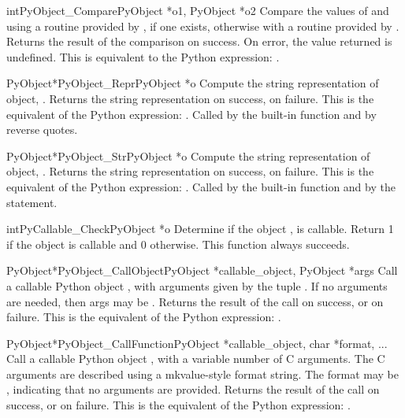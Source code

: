 \documentclass[twoside]{report}
\begin{document}
\begin{cfuncdesc}{int}{PyObject_Compare}{PyObject *o1, PyObject *o2}
Compare the values of  and  using a routine provided by
, if one exists, otherwise with a routine provided by .
Returns the result of the comparison on success.  On error,
the value returned is undefined. This is equivalent to the
Python expression: .
\end{cfuncdesc}


\begin{cfuncdesc}{PyObject*}{PyObject_Repr}{PyObject *o}
Compute the string representation of object, .  Returns the
string representation on success, \NULL{} on failure.  This is
the equivalent of the Python expression: .
Called by the  built-in function and by reverse quotes.
\end{cfuncdesc}


\begin{cfuncdesc}{PyObject*}{PyObject_Str}{PyObject *o}
Compute the string representation of object, .  Returns the
string representation on success, \NULL{} on failure.  This is
the equivalent of the Python expression: .
Called by the  built-in function and by the 
statement.
\end{cfuncdesc}


\begin{cfuncdesc}{int}{PyCallable_Check}{PyObject *o}
Determine if the object , is callable.  Return 1 if the
object is callable and 0 otherwise.
This function always succeeds.
\end{cfuncdesc}


\begin{cfuncdesc}{PyObject*}{PyObject_CallObject}{PyObject *callable_object, PyObject *args}
Call a callable Python object , with
arguments given by the tuple .  If no arguments are
needed, then args may be \NULL{}.  Returns the result of the
call on success, or \NULL{} on failure.  This is the equivalent
of the Python expression: .
\end{cfuncdesc}

\begin{cfuncdesc}{PyObject*}{PyObject_CallFunction}{PyObject *callable_object, char *format, ...}
Call a callable Python object , with a
variable number of C arguments. The C arguments are described
using a mkvalue-style format string. The format may be \NULL{},
indicating that no arguments are provided.  Returns the
result of the call on success, or \NULL{} on failure.  This is
the equivalent of the Python expression: .
\end{cfuncdesc}
\end{document}
